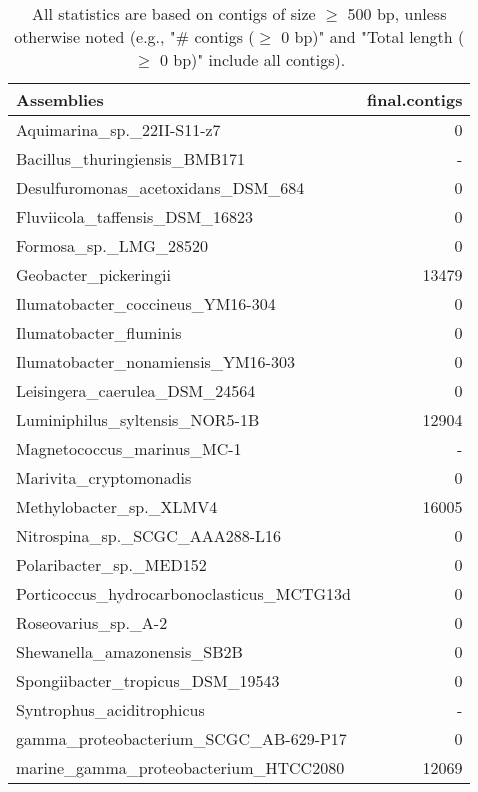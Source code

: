 \documentclass[12pt,a4paper]{article}
\begin{document}
\begin{table}[ht]
\begin{center}
\caption{All statistics are based on contigs of size $\geq$ 500 bp, unless otherwise noted (e.g., "\# contigs ($\geq$ 0 bp)" and "Total length ($\geq$ 0 bp)" include all contigs).}
\begin{tabular}{|l*{1}{|r}|}
\hline
Assemblies & final.contigs \\ \hline
Aquimarina\_sp.\_22II-S11-z7 & 0 \\ \hline
Bacillus\_thuringiensis\_BMB171 & - \\ \hline
Desulfuromonas\_acetoxidans\_DSM\_684 & 0 \\ \hline
Fluviicola\_taffensis\_DSM\_16823 & 0 \\ \hline
Formosa\_sp.\_LMG\_28520 & 0 \\ \hline
Geobacter\_pickeringii & 13479 \\ \hline
Ilumatobacter\_coccineus\_YM16-304 & 0 \\ \hline
Ilumatobacter\_fluminis & 0 \\ \hline
Ilumatobacter\_nonamiensis\_YM16-303 & 0 \\ \hline
Leisingera\_caerulea\_DSM\_24564 & 0 \\ \hline
Luminiphilus\_syltensis\_NOR5-1B & 12904 \\ \hline
Magnetococcus\_marinus\_MC-1 & - \\ \hline
Marivita\_cryptomonadis & 0 \\ \hline
Methylobacter\_sp.\_XLMV4 & 16005 \\ \hline
Nitrospina\_sp.\_SCGC\_AAA288-L16 & 0 \\ \hline
Polaribacter\_sp.\_MED152 & 0 \\ \hline
Porticoccus\_hydrocarbonoclasticus\_MCTG13d & 0 \\ \hline
Roseovarius\_sp.\_A-2 & 0 \\ \hline
Shewanella\_amazonensis\_SB2B & 0 \\ \hline
Spongiibacter\_tropicus\_DSM\_19543 & 0 \\ \hline
Syntrophus\_aciditrophicus & - \\ \hline
gamma\_proteobacterium\_SCGC\_AB-629-P17 & 0 \\ \hline
marine\_gamma\_proteobacterium\_HTCC2080 & 12069 \\ \hline
\end{tabular}
\end{center}
\end{table}
\end{document}
